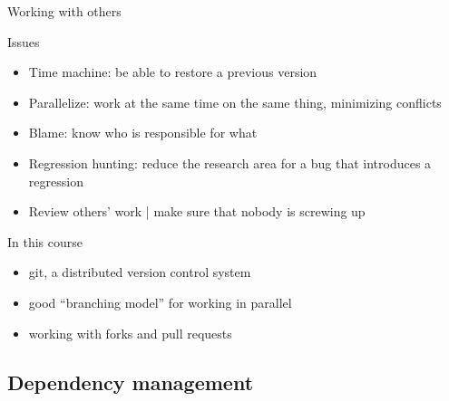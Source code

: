 \documentclass[presentation]{beamer}
\begin{document}
\begin{frame}{Working with others}
    \begin{block}{Issues}
        \begin{itemize}
            \item Time machine: be able to restore a previous version
            \item Parallelize: work at the same time on the same thing, minimizing conflicts
            \item Blame: know who is responsible for what
            \item Regression hunting: reduce the research area for a bug that introduces a regression
            \item Review others' work | make sure that nobody is screwing up
        \end{itemize}
    \end{block}
    \begin{block}{In this course}
        \begin{itemize}
            \item git, a distributed version control system
            \item good ``branching model'' for working in parallel
            \item working with forks and pull requests
        \end{itemize}
    \end{block}
\end{frame}

\subsection{Dependency management}
\end{document}
